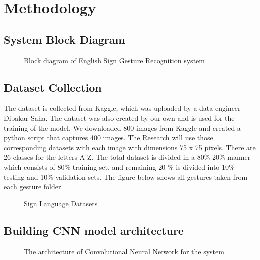 \documentclass[fleqn, 11pt, twoside]{IOEGC}
\begin{document}

\section{Methodology}
\subsection{System Block Diagram}

\begin{figure}[H]\centering
	\caption{Block diagram of English Sign Gesture Recognition system}
	\label{fig:system block diagram}
\end{figure}

\subsection{Dataset Collection}
The dataset is collected from Kaggle, which was uploaded by a data engineer Dibakar Saha. \cite{dataset} The dataset was also created by our own and is used for the training of the model. We downloaded 800 images from Kaggle and created a python script that captures 400 images. The Research will use those corresponding datasets with each image with dimensions 75 x 75 pixels. There are 26 classes for the letters A-Z. The total dataset is divided in a 80\%-20\% manner which consists of 80\% training set, and remaining 20 \% is divided into 10\% testing and 10\% validation sets. The figure below shows all gestures taken from each gesture folder.

\begin{figure}[H]\centering
	\caption{Sign Language Datasets}
	\label{fig:sign language datasets}
\end{figure}

\subsection{Building CNN model architecture}
\begin{figure}[H]\centering
	\caption{The architecture of Convolutional Neural Network for the system}
	\label{fig:model architecture}
\end{figure}
\end{document}
